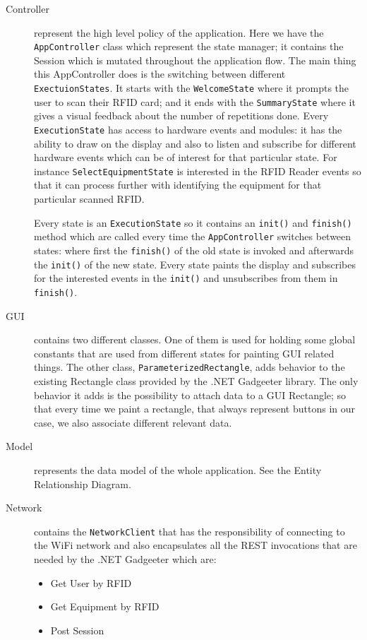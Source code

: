 \documentclass{tk3-team}
\begin{document}
\begin{description}
\item[Controller] represent the high level policy of the application. Here we have the \texttt{AppController} class which represent the state manager; it contains the Session which is mutated throughout the application flow. The main thing this AppController does is the switching between different \texttt{ExectuionStates}. It starts with the \texttt{WelcomeState} where it prompts the user to scan their RFID card; and it ends with the \texttt{SummaryState} where it gives a visual feedback about the number of repetitions done. Every \texttt{ExecutionState} has access to hardware events and modules: it has the ability to draw on the display and also to listen and subscribe for different hardware events which can be of interest for that particular state. For instance \texttt{SelectEquipmentState} is interested in the RFID Reader events so that it can process further with identifying the equipment for that particular scanned RFID. 

Every state is an \texttt{ExecutionState} so it contains an \texttt{init()} and \texttt{finish()} method which are called every time the \texttt{AppController} switches between states: where first the \texttt{finish()} of the old state is invoked and afterwards the \texttt{init()} of the new state. Every state paints the display and subscribes for the interested events in the \texttt{init()} and unsubscribes from them in \texttt{finish()}.

\item[GUI] contains two different classes. One of them is used for holding some global constants that are used from different states for painting GUI related things. The other class, \texttt{ParameterizedRectangle}, adds behavior to the existing Rectangle class provided by the .NET Gadgeeter library. The only behavior it adds is the possibility to attach data to a GUI Rectangle; so that every time we paint a rectangle, that always represent buttons in our case, we also associate different relevant data.

\item[Model] represents the data model of the whole application. See the Entity Relationship Diagram. %

\item[Network] contains the \texttt{NetworkClient} that has the responsibility of connecting to the WiFi network and also encapsulates all the REST invocations that are needed by the .NET Gadgeeter which are: 
\begin{itemize}
	\item Get User by RFID
	\item Get Equipment by RFID 
	\item Post Session
\end{itemize}


\end{description}
\end{document}
